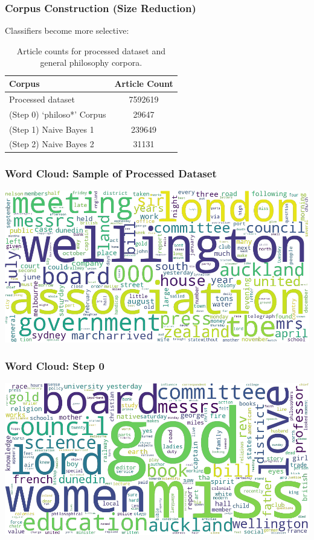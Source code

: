 \documentclass[10pt, compress]{beamer}
\begin{document}
\begin{frame}
	\frametitle{Corpus Construction (Size Reduction)}

	\pause

	Classifiers become more selective:

	\begin{table}[]
	        \centering
	        \begin{tabular}{l|c}
	             Corpus &  Article Count \\
	             \hline
						Processed dataset & 7592619 \\
	        	(Step 0) `philoso*' Corpus &	29647 \\
	        	(Step 1) Naive Bayes 1 &	239649 \\
	          (Step 2) Naive Bayes 2 & 31131
	        \end{tabular}
	        \caption{Article counts for processed dataset and general philosophy corpora.}
	        \label{t:corpus-sizes}
	\end{table}

\end{frame}

\begin{frame}
	\frametitle{Word Cloud: Sample of Processed Dataset}
	\begin{center}
		\includegraphics[width=\textwidth]{images/corpus_10000_subset_tf-idf.png}
	\end{center}
\end{frame}

\begin{frame}
	\frametitle{Word Cloud: Step 0}
	\begin{center}
		\includegraphics[width=\textwidth]{images/philoso_tf-idf.png}
	\end{center}
\end{frame}
\end{document}
